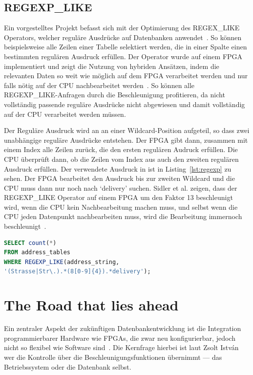 \documentclass[conference]{IEEEtran}
\begin{document}
\subsection{REGEXP\_LIKE}
Ein vorgestelltes Projekt befasst sich mit der Optimierung des REGEX\_LIKE Operators, welcher reguläre Ausdrücke auf Datenbanken anwendet~\cite{istvan_glass_2019}. So können beispielsweise
alle Zeilen einer Tabelle selektiert werden, die in einer Spalte einen bestimmten regulären Ausdruck erfüllen. Der Operator wurde auf einem FPGA implementiert
und zeigt die Nutzung von hybriden Ansätzen, indem die relevanten Daten so weit wie möglich auf dem FPGA verarbeitet werden und nur falls nötig auf der CPU
nachbearbeitet werden~\cite{sidler_accelerating_2017}. So können alle REGEXP\_LIKE-Anfragen durch die Beschleunigung profitieren, da nicht vollständig passende
reguläre Ausdrücke nicht abgewiesen und damit vollständig auf der CPU verarbeitet werden müssen.

Der Reguläre Ausdruck wird an an einer Wildcard-Position aufgeteil, so dass zwei unabhängige reguläre Ausdrücke entstehen. Der FPGA gibt dann, zusammen mit einem Index
alle Zeilen zurück, die den ersten regulären Audruck erfüllen. Die CPU überprüft dann, ob die Zeilen vom Index aus auch den zweiten regulären Ausdruck erfüllen.
Der verwendete Ausdruck in ist in Listing~\ref{lst:regexp} zu sehen. Der FPGA bearbeitet den Ausdruck bis zur zweiten
Wildcard und die CPU muss dann nur noch nach `delivery' suchen. Sidler et al. zeigen, dass der REGEXP\_LIKE Operator auf einem FPGA um den Faktor 13 beschleunigt wird,
wenn die CPU kein Nachbearbeitung machen muss, und selbst wenn die CPU jeden Datenpunkt nachbearbeiten muss, wird die Bearbeitung immernoch beschleunigt~\cite{sidler_accelerating_2017}.


\begin{lstlisting}[language=SQL,frame=single,caption={Regulärer Ausdruck aus \cite{sidler_accelerating_2017}},label={lst:regexp}, float=b]
SELECT count(*)
FROM address_tables
WHERE REGEXP_LIKE(address_string,
'(Strasse|Str\.).*(8[0-9]{4}).*delivery');
\end{lstlisting}

\section{The Road that lies ahead} \label{sec:road_ahead}
Ein zentraler Aspekt der zukünftigen Datenbankentwicklung ist die Integration programmierbarer Hardware wie FPGAs, die zwar neu konfigurierbar, jedoch nicht so flexibel wie Software sind~\cite{istvan_glass_2019}.
Die Kernfrage hierbei ist laut Zsolt Istv\'{a}n wer die Kontrolle über die Beschleunigungsfunktionen übernimmt --- das Betriebssystem oder die Datenbank selbst.
\end{document}
